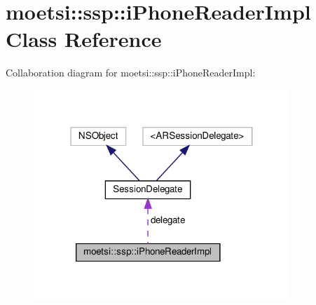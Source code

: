 \hypertarget{classmoetsi_1_1ssp_1_1iPhoneReaderImpl}{}\section{moetsi\+:\+:ssp\+:\+:i\+Phone\+Reader\+Impl Class Reference}
\label{classmoetsi_1_1ssp_1_1iPhoneReaderImpl}


Collaboration diagram for moetsi\+:\+:ssp\+:\+:i\+Phone\+Reader\+Impl\+:
\nopagebreak
\begin{figure}[H]
\begin{center}
\leavevmode
\includegraphics[width=274pt]{classmoetsi_1_1ssp_1_1iPhoneReaderImpl__coll__graph}
\end{center}
\end{figure}
